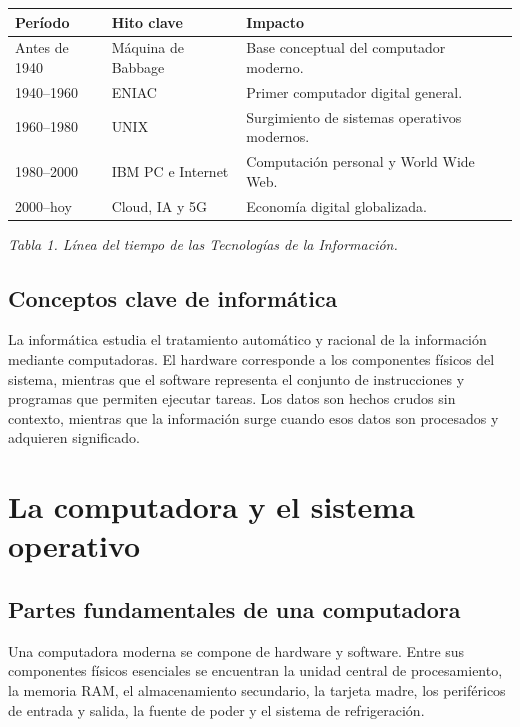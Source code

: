 \documentclass[12pt,a4paper]{article}
\begin{document}
	\begin{center}
		\begin{tabular}{|p{3cm}|p{4cm}|p{6cm}|}
			\hline
			\textbf{Período} & \textbf{Hito clave} & \textbf{Impacto} \\ \hline
			Antes de 1940 & Máquina de Babbage & Base conceptual del computador moderno. \\ \hline
			1940--1960 & ENIAC & Primer computador digital general. \\ \hline
			1960--1980 & UNIX & Surgimiento de sistemas operativos modernos. \\ \hline
			1980--2000 & IBM PC e Internet & Computación personal y World Wide Web. \\ \hline
			2000--hoy & Cloud, IA y 5G & Economía digital globalizada. \\ \hline
		\end{tabular}
		
		\textit{Tabla 1. Línea del tiempo de las Tecnologías de la Información.}
	\end{center}
	
	\subsection{Conceptos clave de informática}
	
	La informática estudia el tratamiento automático y racional de la información mediante computadoras. El hardware corresponde a los componentes físicos del sistema, mientras que el software representa el conjunto de instrucciones y programas que permiten ejecutar tareas. Los datos son hechos crudos sin contexto, mientras que la información surge cuando esos datos son procesados y adquieren significado.
	
	\section{La computadora y el sistema operativo}
	
	\subsection{Partes fundamentales de una computadora}
	
	Una computadora moderna se compone de hardware y software. Entre sus componentes físicos esenciales se encuentran la unidad central de procesamiento, la memoria RAM, el almacenamiento secundario, la tarjeta madre, los periféricos de entrada y salida, la fuente de poder y el sistema de refrigeración.
	
\end{document}
